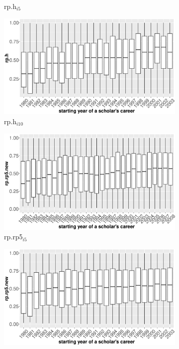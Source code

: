 \begin{refsection}
\begin{figure}[h!]
\begin{subfigure}[b]{0.48\textwidth}
         \caption{rp.h$_{i5}$}
     \end{subfigure}
     \hfill
     \begin{subfigure}[b]{0.48\textwidth}
         \centering
         \includegraphics[width=\textwidth]{figures/exploratory/rph_age10.eps}
         \caption{rp.h$_{i10}$}
     \end{subfigure}
      \hfill
      \begin{subfigure}[b]{0.48\textwidth}
         \centering
         \includegraphics[width=\textwidth]{figures/exploratory/rprp5new_age5.eps}
         \caption{rp.rp5$_{i5}$}
     \end{subfigure}
     \hfill
     \begin{subfigure}[b]{0.48\textwidth}
         \centering
         \includegraphics[width=\textwidth]{figures/exploratory/rprp5new_age10.eps}

\end{subfigure}
\end{figure}
\end{refsection}
